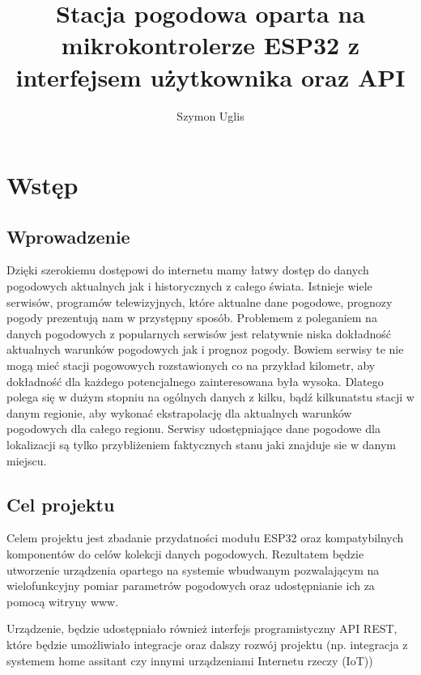 \documentclass[12pt,a4paper]{article}
\title{Stacja pogodowa oparta na mikrokontrolerze ESP32 z interfejsem użytkownika oraz API}
\author{Szymon Uglis}
\begin{document}
\nocite{*}


\tableofcontents{}
\pagebreak

\section{Wstęp}

\subsection{Wprowadzenie}

Dzięki szerokiemu dostępowi do internetu mamy łatwy dostęp do danych pogodowych aktualnych jak i historycznych z całego świata. Istnieje wiele
serwisów, programów telewizyjnych, które aktualne dane pogodowe, prognozy pogody prezentują nam w przystępny sposób.
Problemem z poleganiem na danych pogodowych z popularnych serwisów jest relatywnie niska dokładność aktualnych warunków pogodowych jak i prognoz pogody.
Bowiem serwisy te nie mogą mieć stacji pogowowych rozstawionych co na przykład kilometr, aby dokładność dla każdego potencjalnego zainteresowana była wysoka.
Dlatego polega się w dużym stopniu na ogólnych danych z kilku, bądź kilkunatstu stacji w danym regionie, aby wykonać ekstrapolację dla
aktualnych warunków pogodowych dla całego regionu. 
Serwisy udostępniające dane pogodowe dla lokalizacji są tylko przybliżeniem faktycznych stanu jaki znajduje sie w danym miejscu. 

\subsection{Cel projektu}

Celem projektu jest zbadanie przydatności modułu ESP32 oraz kompatybilnych komponentów do celów kolekcji danych pogodowych. 
Rezultatem będzie utworzenie urządzenia opartego na systemie wbudwanym pozwalającym na wielofunkcyjny pomiar parametrów pogodowych oraz udostępnianie ich za pomocą witryny www.

Urządzenie, będzie udostępniało również interfejs programistyczny API REST, które będzie umożliwiało integracje oraz dalszy rozwój projektu 
(np. integracja z systemem home assitant czy innymi urządzeniami Internetu rzeczy (IoT))
\end{document}
